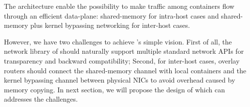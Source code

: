 The architecture enable the possibility to make traffic among containers flow
through an efficient data-plane: shared-memory for intra-host cases and shared-memory plus kernel bypassing networking for inter-host cases.

However, we have two challenges to achieve \sysname's simple vision.
First of all, the network library of \sysname should naturally support
multiple standard network APIs for transparency and backward compatibility;
Second, for inter-host cases, overlay routers should connect the shared-memory
channel with local containers and the kernel bypassing channel between physical NICs to avoid overhead caused by memory copying. In next section, we will propose
the design of \sysname which can addresses the challenges.
